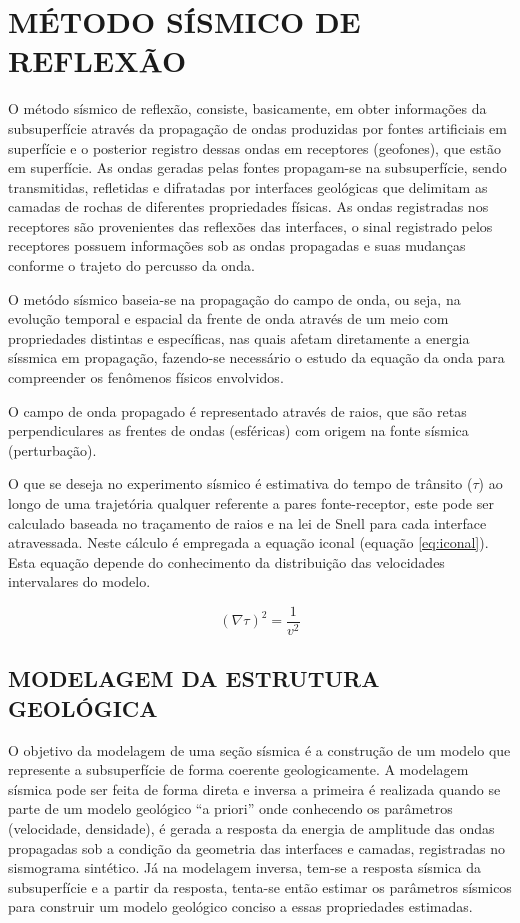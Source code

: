 \chapter{MÉTODO SÍSMICO DE REFLEXÃO}
\label{cap.2}

O método sísmico de reflexão, consiste, basicamente, em obter informações da subsuperfície através da propagação de ondas produzidas por fontes artificiais em superfície e o posterior registro dessas ondas em receptores (geofones), que estão em superfície.
As ondas geradas pelas fontes propagam-se na subsuperfície, sendo transmitidas, refletidas e difratadas por interfaces geológicas que delimitam as camadas de rochas de diferentes propriedades físicas.
As ondas registradas nos receptores são provenientes das reflexões das interfaces, o sinal registrado pelos receptores possuem informações sob as ondas propagadas e suas mudanças conforme o trajeto do percusso da onda.


O metódo sísmico baseia-se na propagação do campo de onda, ou seja, na evolução temporal e espacial da frente de onda através de um meio com propriedades distintas e específicas, nas quais afetam diretamente a energia síssmica em propagação, fazendo-se necessário o estudo da equação da onda para compreender os fenômenos físicos envolvidos.

O campo de onda propagado é representado através de raios, que são retas perpendiculares as frentes de ondas (esféricas) com origem na fonte sísmica (perturbação).

O que se deseja no experimento sísmico é estimativa do tempo de trânsito ($\tau$) ao longo de uma trajetória qualquer referente a pares fonte-receptor, este pode ser calculado baseada no traçamento de raios e na lei de Snell para cada interface atravessada. Neste cálculo é empregada a equação iconal (equação \ref{eq:iconal}). Esta equação depende do conhecimento da distribuição das velocidades intervalares do modelo.

\begin{equation}
(\nabla \tau)^{2}=\frac{1}{v^{2}}
\label{eq:iconal}
\end{equation}

\section{MODELAGEM DA ESTRUTURA GEOLÓGICA}

O objetivo da modelagem de uma seção sísmica é a construção de um modelo que represente a subsuperfície de forma coerente geologicamente. A modelagem sísmica pode ser feita de forma direta e inversa a primeira é realizada quando se parte de um modelo geológico ``a priori'' onde conhecendo os parâmetros (velocidade, densidade), é gerada a resposta da energia de amplitude das ondas propagadas sob a condição da geometria das interfaces e camadas, registradas no sismograma sintético. Já na modelagem inversa, tem-se a resposta sísmica da subsuperfície e a partir da resposta, tenta-se então estimar os parâmetros sísmicos para construir um modelo geológico conciso a essas propriedades estimadas.

